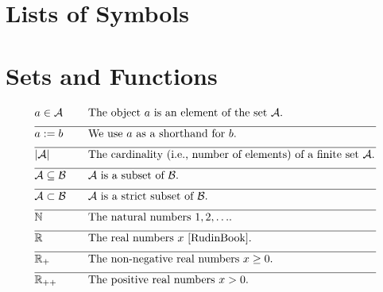 
\section*{Lists of Symbols}

\vspace*{-2mm}
\section*{Sets and Functions} 

\begin{align} 
	&a \in \mathcal{A} & \quad & \parbox{.75\textwidth}{The object $a$ is an element of the set $\mathcal{A}$.} \nonumber \\[2mm] \hline \nonumber\\[-5mm]
	&a \defeq b & \quad & \mbox{We use $a$ as a shorthand for $b$. }\nonumber \\[2mm] \hline \nonumber\\[-5mm]
	&|\mathcal{A}| & \quad & \mbox{The cardinality (i.e., number of elements) of a finite set $\mathcal{A}$.}\nonumber \\[2mm] \hline \nonumber\\[-5mm]
	&\mathcal{A} \subseteq \mathcal{B}& \quad & \mbox{$\mathcal{A}$ is a subset of $\mathcal{B}$.}\nonumber \\[2mm] \hline \nonumber\\[-5mm]
	&\mathcal{A} \subset \mathcal{B}& \quad & \mbox{$\mathcal{A}$ is a strict subset of $\mathcal{B}$.} \nonumber \\[2mm] \hline \nonumber\\[-5mm]
	&\mathbb{N} & \quad & \mbox{The natural numbers $1,2,\ldots$.}\nonumber \\[2mm] \hline \nonumber\\[-5mm]
	&\mathbb{R}  &\quad &\mbox{The real numbers $x$ \cite{RudinBook}.} \nonumber \\[2mm] \hline \nonumber\\[-5mm]
	&\mathbb{R}_{+}  &\quad &\mbox{The non-negative real numbers $x\geq0$.}\nonumber \\[2mm] \hline \nonumber\\[-5mm]
	&\mathbb{R}_{++}  &\quad &\mbox{The positive real numbers $x> 0$.} \nonumber
\end{align} 


